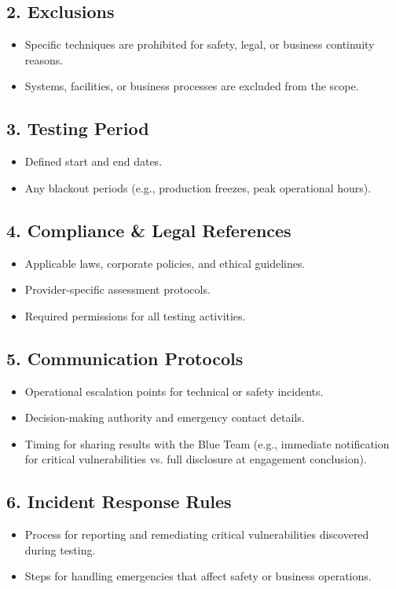 \subsection{2. Exclusions}
\begin{itemize}
    \item Specific techniques are prohibited for safety, legal, or business continuity reasons.
    \item Systems, facilities, or business processes are excluded from the scope.
\end{itemize}

\subsection{3. Testing Period}
\begin{itemize}
    \item Defined start and end dates.
    \item Any blackout periods (e.g., production freezes, peak operational hours).
\end{itemize}

\subsection{4. Compliance \& Legal References}
\begin{itemize}
    \item Applicable laws, corporate policies, and ethical guidelines.
    \item Provider-specific assessment protocols.
    \item Required permissions for all testing activities.
\end{itemize}

\subsection{5. Communication Protocols}
\begin{itemize}
    \item Operational escalation points for technical or safety incidents.
    \item Decision-making authority and emergency contact details.
    \item Timing for sharing results with the Blue Team (e.g., immediate notification for critical vulnerabilities vs. full disclosure at engagement conclusion).
\end{itemize}

\subsection{6. Incident Response Rules}
\begin{itemize}
    \item Process for reporting and remediating critical vulnerabilities discovered during testing.
    \item Steps for handling emergencies that affect safety or business operations.
\end{itemize}

